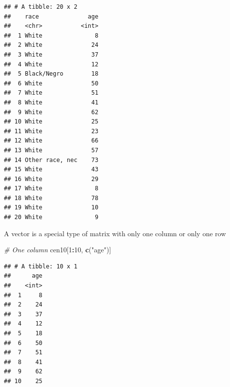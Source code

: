 \documentclass[]{book}
\newenvironment{Shaded}{\begin{snugshade}}{\end{snugshade}}
\newcommand{\CommentTok}[1]{\textcolor[rgb]{0.56,0.35,0.01}{\textit{#1}}}
\newcommand{\DecValTok}[1]{\textcolor[rgb]{0.00,0.00,0.81}{#1}}
\newcommand{\KeywordTok}[1]{\textcolor[rgb]{0.13,0.29,0.53}{\textbf{#1}}}
\newcommand{\NormalTok}[1]{#1}
\newcommand{\OperatorTok}[1]{\textcolor[rgb]{0.81,0.36,0.00}{\textbf{#1}}}
\newcommand{\StringTok}[1]{\textcolor[rgb]{0.31,0.60,0.02}{#1}}
\theoremstyle{definition}
\theoremstyle{definition}
\theoremstyle{definition}
\theoremstyle{remark}
\begin{document}
\begin{Shaded}
\begin{Highlighting}[]
\begin{Shaded}
\end{Shaded}

\begin{verbatim}
## # A tibble: 20 x 2
##    race              age
##    <chr>           <int>
##  1 White               8
##  2 White              24
##  3 White              37
##  4 White              12
##  5 Black/Negro        18
##  6 White              50
##  7 White              51
##  8 White              41
##  9 White              62
## 10 White              25
## 11 White              23
## 12 White              66
## 13 White              57
## 14 Other race, nec    73
## 15 White              43
## 16 White              29
## 17 White               8
## 18 White              78
## 19 White              10
## 20 White               9
\end{verbatim}

A vector is a special type of matrix with only one column or only one row

\begin{Shaded}
\begin{Highlighting}[]
\CommentTok{# One column}
\NormalTok{cen10[}\DecValTok{1}\OperatorTok{:}\DecValTok{10}\NormalTok{, }\KeywordTok{c}\NormalTok{(}\StringTok{"age"}\NormalTok{)]}
\end{Highlighting}
\end{Shaded}

\begin{verbatim}
## # A tibble: 10 x 1
##      age
##    <int>
##  1     8
##  2    24
##  3    37
##  4    12
##  5    18
##  6    50
##  7    51
##  8    41
##  9    62
## 10    25
\end{verbatim}

\begin{Shaded}
\end{Shaded}


\end{Highlighting}
\end{Shaded}
\end{document}
